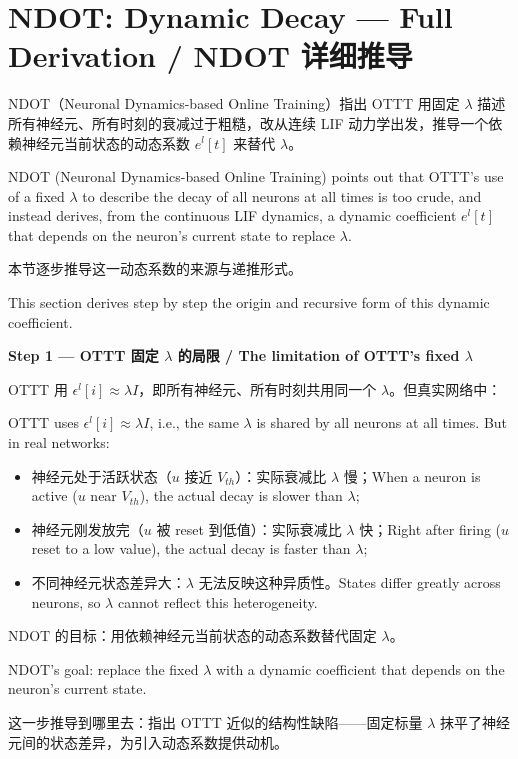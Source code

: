 \documentclass[journal,12pt,onecolumn]{IEEEtran}
\begin{document}
\section{NDOT: Dynamic Decay — Full Derivation / NDOT 详细推导}

NDOT（Neuronal Dynamics-based Online Training）指出 OTTT 用固定 $\lambda$ 描述所有神经元、所有时刻的衰减过于粗糙，改从连续 LIF 动力学出发，推导一个依赖神经元当前状态的动态系数 $e^l[t]$ 来替代 $\lambda$。

NDOT (Neuronal Dynamics-based Online Training) points out that OTTT's use of a fixed $\lambda$ to describe the decay of all neurons at all times is too crude, and instead derives, from the continuous LIF dynamics, a dynamic coefficient $e^l[t]$ that depends on the neuron's current state to replace $\lambda$.

本节逐步推导这一动态系数的来源与递推形式。

This section derives step by step the origin and recursive form of this dynamic coefficient.

\medskip\noindent\textbf{Step 1 — OTTT 固定 $\lambda$ 的局限 / The limitation of OTTT's fixed $\lambda$}

OTTT 用 $\epsilon^l[i]\approx\lambda I$，即所有神经元、所有时刻共用同一个 $\lambda$。但真实网络中：

OTTT uses $\epsilon^l[i]\approx\lambda I$, i.e., the same $\lambda$ is shared by all neurons at all times. But in real networks:

\begin{itemize}[leftmargin=1.5em,itemsep=2pt]
\item 神经元处于活跃状态（$u$ 接近 $V_{th}$）：实际衰减比 $\lambda$ 慢；\quad When a neuron is active ($u$ near $V_{th}$), the actual decay is slower than $\lambda$;
\item 神经元刚发放完（$u$ 被 reset 到低值）：实际衰减比 $\lambda$ 快；\quad Right after firing ($u$ reset to a low value), the actual decay is faster than $\lambda$;
\item 不同神经元状态差异大：$\lambda$ 无法反映这种异质性。\quad States differ greatly across neurons, so $\lambda$ cannot reflect this heterogeneity.
\end{itemize}

NDOT 的目标：用依赖神经元当前状态的动态系数替代固定 $\lambda$。

NDOT's goal: replace the fixed $\lambda$ with a dynamic coefficient that depends on the neuron's current state.

这一步推导到哪里去：指出 OTTT 近似的结构性缺陷——固定标量 $\lambda$ 抹平了神经元间的状态差异，为引入动态系数提供动机。
\end{document}
